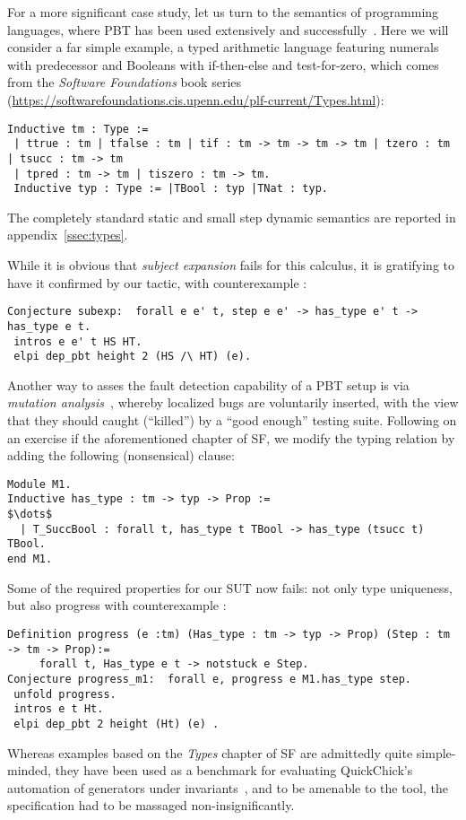 For a more significant case study, let us turn to the semantics of
programming languages, where PBT has been used extensively and
successfully~\cite{Klein12}. Here we will consider a far simple example,
a typed arithmetic language featuring numerals with predecessor
and Booleans with if-then-else and test-for-zero, which comes from the \emph{Software Foundations} book series
(\url{https://softwarefoundations.cis.upenn.edu/plf-current/Types.html}):
\begin{lstlisting}
Inductive tm : Type :=
 | ttrue : tm | tfalse : tm | tif : tm -> tm -> tm -> tm | tzero : tm | tsucc : tm -> tm
 | tpred : tm -> tm | tiszero : tm -> tm.
 Inductive typ : Type := |TBool : typ |TNat : typ.
\end{lstlisting}
The completely standard static and small step dynamic semantics are
reported in appendix~\ref{ssec:types}.

While it is obvious that \emph{subject expansion} fails for this calculus, it is gratifying to have it confirmed by our tactic, with counterexample :
\begin{lstlisting}
Conjecture subexp:  forall e e' t, step e e' -> has_type e' t -> has_type e t. 
 intros e e' t HS HT.
 elpi dep_pbt height 2 (HS /\ HT) (e).
\end{lstlisting}

Another way to asses the fault detection capability of a PBT setup is via \emph{mutation analysis}~\cite{CavadaCM20}, whereby localized bugs are voluntarily inserted, with the view that they should caught (``killed'') by a ``good enough'' testing suite. Following on  an exercise if the aforementioned chapter of SF, we modify the typing relation by adding the following (nonsensical)  clause:

\begin{lstlisting}
Module M1.
Inductive has_type : tm -> typ -> Prop :=
$\dots$
  | T_SuccBool : forall t, has_type t TBool -> has_type (tsucc t) TBool.
end M1.
\end{lstlisting}
Some of the required properties for our SUT now fails: not
only type uniqueness, but also progress with counterexample :
\begin{lstlisting}
Definition progress (e :tm) (Has_type : tm -> typ -> Prop) (Step : tm -> tm -> Prop):= 
     forall t, Has_type e t -> notstuck e Step.
Conjecture progress_m1:  forall e, progress e M1.has_type step.
 unfold progress.
 intros e t Ht.    
 elpi dep_pbt 2 height (Ht) (e) .  
\end{lstlisting}

Whereas examples based on the \emph{Types} chapter of SF are
admittedly quite simple-minded, they have been used as a benchmark for
evaluating \textsf{QuickChick}'s automation of generators under
invariants~\cite{LampropoulosPP18}, and to be amenable to the tool,
the specification had to be massaged non-insignificantly.

